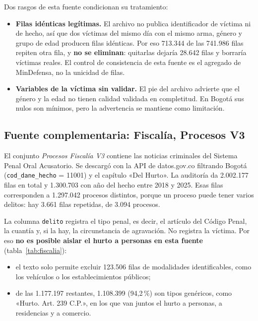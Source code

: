\documentclass[12pt,letterpaper]{article}
\begin{document}
Dos rasgos de esta fuente condicionan su tratamiento:
\begin{itemize}
  \item \textbf{Filas idénticas legítimas.} El archivo no publica identificador de víctima ni de hecho, así que dos víctimas del mismo día con el mismo arma, género y grupo de edad producen filas idénticas. Por eso 713.344 de las 741.986 filas repiten otra fila, y \textbf{no se eliminan}: quitarlas dejaría 28.642 filas y borraría víctimas reales. El control de consistencia de esta fuente es el agregado de MinDefensa, no la unicidad de filas.
  \item \textbf{Variables de la víctima sin validar.} El pie del archivo advierte que el género y la edad no tienen calidad validada en completitud. En Bogotá sus nulos son mínimos, pero la advertencia se mantiene como limitación.
\end{itemize}

\subsection{Fuente complementaria: Fiscalía, Procesos V3}

El conjunto \emph{Procesos Fiscalía V3} contiene las noticias criminales del Sistema Penal Oral Acusatorio. Se descargó con la API de datos.gov.co filtrando Bogotá (\texttt{cod\_dane\_hecho} = 11001) y el capítulo «Del Hurto». La auditoría da 2.002.177 filas en total y 1.300.703 con año del hecho entre 2018 y 2025. Esas filas corresponden a 1.297.042 procesos distintos, porque un proceso puede tener varios delitos: hay 3.661 filas repetidas, de 3.094 procesos.

La columna \texttt{delito} registra el tipo penal, es decir, el artículo del Código Penal, la cuantía y, si la hay, la circunstancia de agravación. No registra la víctima. Por eso \textbf{no es posible aislar el hurto a personas en esta fuente} (tabla~\ref{tab:fiscalia}):
\begin{itemize}
  \item el texto solo permite excluir 123.506 filas de modalidades identificables, como los vehículos o los establecimientos públicos;
  \item de las 1.177.197 restantes, 1.108.399 (94,2\,\%) son tipos genéricos, como «Hurto. Art. 239 C.P.», en los que van juntos el hurto a personas, a residencias y a comercio.
\end{itemize}
\end{document}
